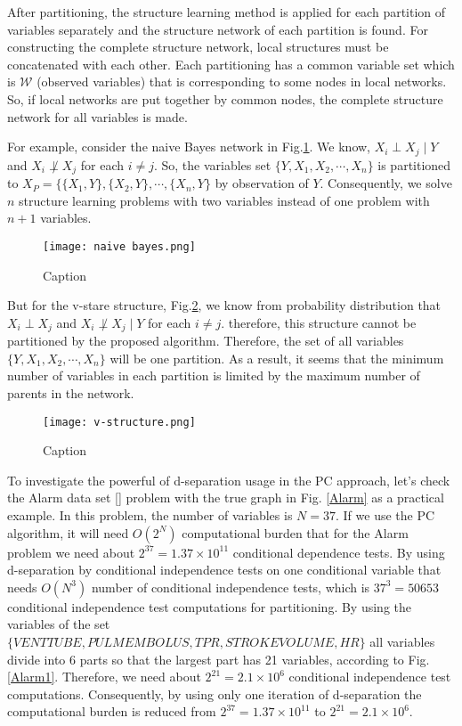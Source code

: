 \documentclass{article}
\newcommand{\W}{\mathcal{W}}
\begin{document}
After partitioning, the structure learning method is applied for each partition of variables separately and the structure network of each partition is found. For constructing the complete structure network, local structures must be concatenated with each other. Each partitioning has a common variable set which is $\W$ (observed variables) that is corresponding to some nodes in local networks. So, if local networks are put together by common nodes, the complete structure network for all variables is made.

For example, consider the naive Bayes network in Fig.\ref{f-naive}. We know, $X_i\perp X_j \mid Y$ and $X_i\not\perp X_j$ for each $i\not = j$. So, the variables set $\{Y,X_1,X_2,\cdots, X_n\}$ is partitioned to $X_P = \{ \{X_1,Y\}, \{X_2,Y\}, \cdots, \{X_n,Y\}$ by observation of $Y$. Consequently, we solve $n$ structure learning problems with two variables instead of one problem with $n+1$ variables.

\begin{figure}[!ht]
    \centering
    \texttt{[image: naive bayes.png]}
    \caption{Caption}
    \label{f-naive}
\end{figure}

But for the v-stare structure, Fig.\ref{f-vstare}, we know from probability distribution that $X_i\perp X_j$ and  $X_i\not\perp X_j\mid Y$ for each $i\not = j$. therefore, this structure cannot be partitioned by the proposed algorithm. Therefore, the set of all variables $\{Y,X_1,X_2,\cdots, X_n\}$ will be one partition. As a result, it seems that the minimum number of variables in each partition is limited by the maximum number of parents in the network.
\begin{figure}[!ht]
    \centering
    \texttt{[image: v-structure.png]}
    \caption{Caption}
    \label{f-vstare}
\end{figure}

To investigate the powerful of d-separation usage in the PC approach, let's check the Alarm data set [] problem with the true graph in Fig. \ref{Alarm} as a practical example.
In this problem, the number of variables is $N=37$. If we use the PC algorithm, it will need $O(2^N)$ computational burden that for the Alarm problem we need about $2^{37}=1.37\times 10^{11}$ conditional dependence tests.
By using d-separation by conditional independence tests on one conditional variable that needs $O(N^3)$ number of conditional independence tests, which is $37^3=50653$ conditional independence test computations for partitioning. By using the variables of the set $\{VENTTUBE, PULMEMBOLUS, TPR, STROKEVOLUME, HR \}$ all variables divide into 6 parts so that the largest part has 21 variables, according to Fig.\ref{Alarm1}. Therefore, we need about $2^{21}=2.1\times 10^6$ conditional independence test computations. Consequently, by using only one iteration of d-separation the computational burden is reduced from $2^{37}=1.37\times 10^{11}$ to $2^{21}=2.1\times 10^6$.
\end{document}
